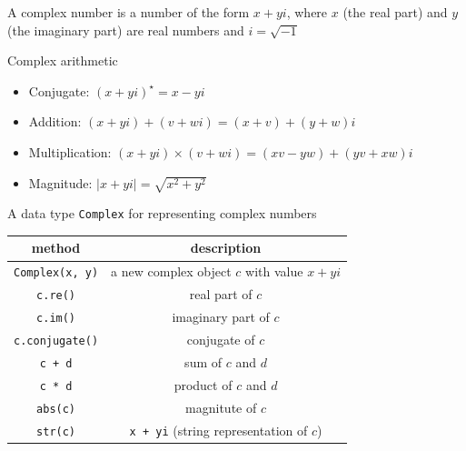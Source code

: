 \documentclass[8pt,a4paper,compress,handout]{beamer}
\begin{document}
\begin{frame}[fragile]
A complex number is a number of the form $x+yi$, where $x$ (the real part) and $y$ (the imaginary part) are real numbers and $i=\sqrt{-1}$

\bigskip

Complex arithmetic
\begin{itemize}
\item Conjugate: $(x+yi)^\star=x-yi$

\item Addition: $(x+yi)+(v+wi) = (x+v) + (y+w)i$

\item Multiplication: $(x+yi)\times(v+wi) = (xv-yw) + (yv+xw)i$

\item Magnitude: $|x+yi|=\sqrt{x^2+y^2}$
\end{itemize}

\bigskip

A data type \lstinline{Complex} for representing complex numbers
\begin{center}
\begin{tabular}{cc}
method & description \\ \hline
\lstinline$Complex(x, y)$ & a new complex object $c$ with value $x + yi$ \\
\lstinline$c.re()$ & real part of $c$ \\
\lstinline$c.im()$ & imaginary part of $c$ \\
\lstinline$c.conjugate()$ & conjugate of $c$ \\
\lstinline$c + d$ & sum of $c$ and $d$ \\
\lstinline$c * d$ & product of $c$ and $d$ \\
\lstinline$abs(c)$ & magnitute of $c$ \\
\lstinline$str(c)$ & \lstinline$x + yi$ (string representation of $c$)
\end{tabular} 
\end{center}
\end{frame}
\end{document}
